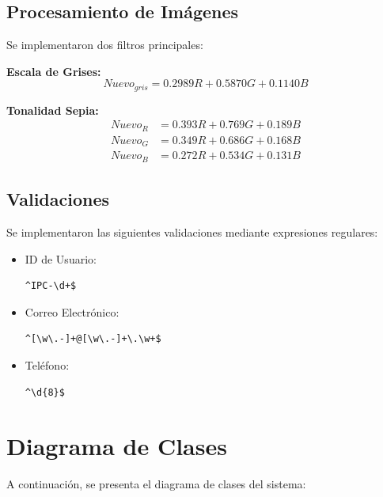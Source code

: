 \documentclass[letterpaper,12pt]{article}
\begin{document}
\begin{multicols}{2}
    \subsection*{Procesamiento de Imágenes}
    Se implementaron dos filtros principales:

    \textbf{Escala de Grises:}
    \begin{equation*}
    Nuevo_{gris} = 0.2989R + 0.5870G + 0.1140B
    \end{equation*}

    \textbf{Tonalidad Sepia:}
    \begin{equation*}
    \begin{aligned}
    Nuevo_{R} &= 0.393R + 0.769G + 0.189B \\
    Nuevo_{G} &= 0.349R + 0.686G + 0.168B \\
    Nuevo_{B} &= 0.272R + 0.534G + 0.131B
    \end{aligned}
    \end{equation*}

    \subsection*{Validaciones}
    Se implementaron las siguientes validaciones mediante expresiones regulares:

    \begin{itemize}
        \item ID de Usuario: 
        \begin{lstlisting}[basicstyle=\ttfamily]
^IPC-\d+$
        \end{lstlisting}
        \item Correo Electrónico: 
        \begin{lstlisting}[basicstyle=\ttfamily]
^[\w\.-]+@[\w\.-]+\.\w+$
        \end{lstlisting}
        \item Teléfono: 
        \begin{lstlisting}[basicstyle=\ttfamily]
^\d{8}$
        \end{lstlisting}
    \end{itemize}
    

\end{multicols}

\clearpage
\section*{Diagrama de Clases}
A continuación, se presenta el diagrama de clases del sistema:
\end{document}
